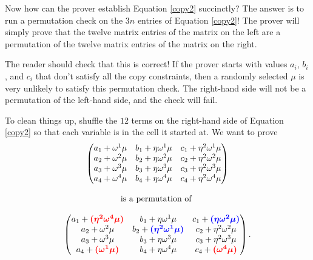 Now how can the prover establish Equation \eqref{copy2}
succinctly? The answer is to run a permutation check on the $3n$
entries of Equation \eqref{copy2}! The prover will simply prove
that the twelve matrix entries of the matrix on the left are a
permutation of the twelve matrix entries of the matrix on the right.

The reader should check that this is correct! If the prover starts with
values $a_{i}$, $b_{i}$, and $c_{i}$ that don't satisfy all the
copy constraints, then a randomly selected $\mu$ is very unlikely to
satisfy this permutation check. The right-hand side will not be a
permutation of the left-hand side, and the check will fail.

To clean things up, shuffle the $12$ terms on the right-hand side of
Equation \eqref{copy2} so that each variable is in the cell it
started at. We want to prove
\begin{equation}
\label{copy3}
\begin{array}{c}
\begin{pmatrix}
a_{1} + \omega^{1}\mu & b_{1} + \eta\omega^{1}\mu & c_{1} + \eta^{2}\omega^{1}\mu \\
a_{2} + \omega^{2}\mu & b_{2} + \eta\omega^{2}\mu & c_{2} + \eta^{2}\omega^{2}\mu \\
a_{3} + \omega^{3}\mu & b_{3} + \eta\omega^{3}\mu & c_{3} + \eta^{2}\omega^{3}\mu \\
a_{4} + \omega^{4}\mu & b_{4} + \eta\omega^{4}\mu & c_{4} + \eta^{2}\omega^{4}\mu
\end{pmatrix} \\ \\
\text{is a permutation of } \\ \\
\begin{pmatrix}
a_{1} + \textcolor{red}{\boldsymbol{({\eta^{2}\omega^{4}\mu})}} & b_{1} + \eta\omega^{1}\mu & c_{1} + \textcolor{blue}{\boldsymbol{({\eta\omega^{2}\mu})}} \\
a_{2} + \omega^{2}\mu & b_{2} + \textcolor{blue}{\boldsymbol{({\eta^{2}\omega^{1}\mu})}} & c_{2} + \eta^{2}\omega^{2}\mu \\
a_{3} + \omega^{3}\mu & b_{3} + \eta\omega^{3}\mu & c_{3} + \eta^{2}\omega^{3}\mu \\
a_{4} + \textcolor{red}{\boldsymbol{({\omega^{1}\mu})}} & b_{4} + \eta\omega^{4}\mu & c_{4} + \textcolor{red}{\boldsymbol{({\omega^{4}\mu})}}
\end{pmatrix}.
\end{array}
\end{equation}

